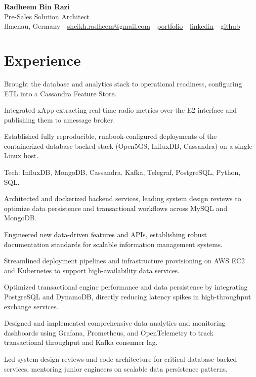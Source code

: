 \documentclass[10pt,a4paper]{resume}
\makeatletter
\newcommand{\Portfolio}{https://radheem.github.io/my-cv}
\newcommand{\PortfolioText}{portfolio}
\newcommand{\GitHub}{https://github.com/radheem}
\newcommand{\LinkedIn}{https://www.linkedin.com/in/radheem-razi}
\newcommand{\Email}{sheikh.radheem@gmail.com}
\makeatother
\begin{document}
\begin{center}
  {\huge\bfseries Radheem Bin Razi}\\[3pt]
  {\large Pre-Sales Solution Architect}\\[6pt]
  \small
  Ilmenau, Germany \,\textbar\,
  \href{mailto:\Email}{\Email} \,\textbar\,
  \href{\Portfolio}{\PortfolioText} \,\textbar\,
  \href{\LinkedIn}{linkedin} \,\textbar\,
  \href{\GitHub}{github}
\end{center}
\vspace{2pt}

\section{Experience}

\bullets
  \item Brought the database and analytics stack to operational readiness, configuring ETL into a Cassandra Feature Store.
  \item Integrated xApp extracting real-time radio metrics over the E2 interface and publishing them to amessage broker.
  \item Established fully reproducible, runbook-configured deployments of the containerized database-backed stack (Open5GS, InfluxDB, Cassandra) on a single Linux host.
  \item Tech: InfluxDB, MongoDB, Cassandra, Kafka, Telegraf, PostgreSQL, Python, SQL.
\bulletsend
\vspace{1.5pt}
\bullets
  \item Architected and dockerized backend services, leading system design reviews to optimize data persistence and transactional workflows across MySQL and MongoDB.
  \item Engineered new data-driven features and APIs, establishing robust documentation standards for scalable information management systems.
  \item Streamlined deployment pipelines and infrastructure provisioning on AWS EC2 and Kubernetes to support high-availability data services.
\bulletsend
\vspace{1.5pt}
\bullets
  \item Optimized transactional engine performance and data persistence by integrating PostgreSQL and DynamoDB, directly reducing latency spikes in high-throughput exchange services.
  \item Designed and implemented comprehensive data analytics and monitoring dashboards using Grafana, Prometheus, and OpenTelemetry to track transactional throughput and Kafka consumer lag.
  \item Led system design reviews and code architecture for critical database-backed services, mentoring junior engineers on scalable data persistence patterns.
\bulletsend
\vspace{1.5pt}
\end{document}
